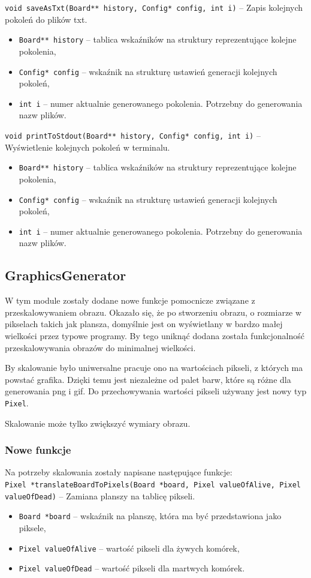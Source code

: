 \documentclass{mwart}
\begin{document}
\noindent{}\texttt{void saveAsTxt(Board** history, Config* config, int i)} -- Zapis kolejnych pokoleń do plików txt.
\begin{itemize}[label={}]
	\item\texttt{Board** history} -- tablica wskaźników na struktury reprezentujące kolejne pokolenia,
	\item\texttt{Config* config} -- wskaźnik na strukturę ustawień generacji kolejnych pokoleń,
	\item \texttt{int i} -- numer aktualnie generowanego pokolenia. Potrzebny do generowania nazw plików.
\end{itemize}

\noindent{}\texttt{void printToStdout(Board** history, Config* config, int i)} -- Wyświetlenie kolejnych pokoleń w terminalu.
\begin{itemize}[label={}]
	\item\texttt{Board** history} -- tablica wskaźników na struktury reprezentujące kolejne pokolenia,
	\item\texttt{Config* config} -- wskaźnik na strukturę ustawień generacji kolejnych pokoleń,
	\item \texttt{int i} -- numer aktualnie generowanego pokolenia. Potrzebny do generowania nazw plików.
\end{itemize}

\subsection{GraphicsGenerator}
W tym module zostały dodane nowe funkcje pomocnicze związane z przeskalowywaniem obrazu. Okazało się, że po stworzeniu obrazu, o rozmiarze w pikselach takich jak plansza, domyślnie jest on wyświetlany w bardzo małej wielkości przez typowe programy. By tego uniknąć dodana została funkcjonalność przeskalowywania obrazów do minimalnej wielkości.

By skalowanie było uniwersalne pracuje ono na wartościach pikseli, z których ma powstać grafika. Dzięki temu jest niezależne od palet barw, które są różne dla generowania png i gif. Do przechowywania wartości pikseli używany jest nowy typ \texttt{Pixel}.

Skalowanie może tylko zwiększyć wymiary obrazu.

\subsubsection*{Nowe funkcje}
Na potrzeby skalowania zostały napisane następujące funkcje:\\
\noindent{}\texttt{Pixel *translateBoardToPixels(Board *board, Pixel valueOfAlive, Pixel valueOfDead)} -- Zamiana planszy na tablicę pikseli.
\begin{itemize}[label={}]
	\item\texttt{Board *board} -- wskaźnik na planszę, która ma być przedstawiona jako piksele,
	\item\texttt{Pixel valueOfAlive} -- wartość pikseli dla żywych komórek,
	\item \texttt{Pixel valueOfDead} -- wartość pikseli dla martwych komórek.
\end{itemize}
\end{document}
